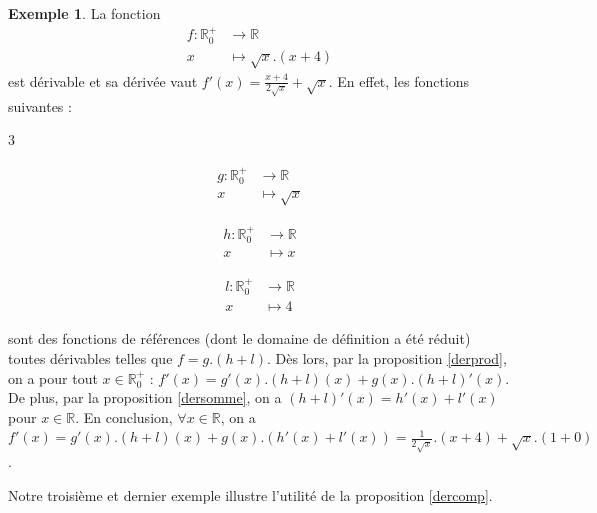 \documentclass[a4paper,fontsize=13pt]{scrreprt}
\theoremstyle{plain}
\theoremstyle{definition}
\newtheorem{exe}[subsection]{Exemple}
\newcommand{\rr}{\mathbb{R}}
\begin{document}
\begin{exe}
	La fonction
	\begin{align*}
	f  : {\rr}^{+}_0 &\to \rr \\
	x &\mapsto \sqrt{x}.(x+4)
	\end{align*}
	est dérivable et sa dérivée vaut $f'(x)=\frac{x+4}{2\sqrt{x}}+\sqrt{x}$. En effet, les fonctions suivantes :
	\begin{itemize}
	\end{itemize}
	sont des fonctions de références (dont le domaine de définition a été réduit) toutes dérivables telles que $f = g.(h+l)$. Dès lors, par la proposition \ref{derprod}, on a pour tout $x \in \rr^{+}_0$ : $f'(x)=g'(x).(h+l)(x)+g(x).(h+l)'(x)$. De plus, par la proposition \ref{dersomme}, on a $(h+l)'(x)=h'(x)+l'(x)$ pour $x \in \rr$. En conclusion, $\forall x \in \rr$, on a $f'(x)=g'(x).(h+l)(x)+g(x).(h'(x)+l'(x))=\frac{1}{2\sqrt{x}}.(x+4)+\sqrt{x}.(1+0)$.
\end{exe}
Notre troisième et dernier exemple illustre l'utilité de la proposition \ref{dercomp}.
\end{document}

